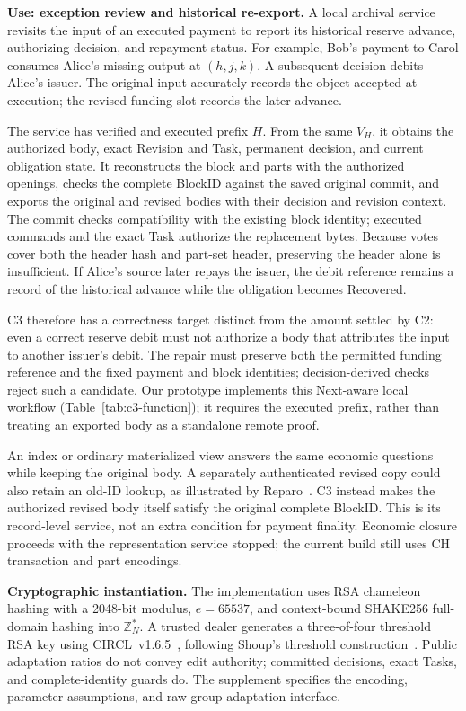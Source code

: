 \noindent\textbf{Use: exception review and historical re-export.}
A local archival service revisits the input of an executed payment
to report its historical reserve advance, authorizing decision, and
repayment status. For example, Bob's payment to Carol consumes Alice's
missing output at $(h,j,k)$. A subsequent decision debits Alice's issuer.
The original input accurately records the object accepted at execution;
the revised funding slot records the later advance.

The service has verified and executed prefix $H$. From the same $V_H$,
it obtains the authorized body, exact Revision and Task, permanent
decision, and current obligation state. It reconstructs the block and
parts with the authorized openings, checks the complete BlockID against
the saved original commit, and exports the original and revised bodies
with their decision and revision context. The commit checks compatibility
with the existing block identity; executed commands and the exact Task
authorize the replacement bytes. Because votes cover both the header
hash and part-set header, preserving the header alone is insufficient.
If Alice's source later repays the issuer, the debit reference remains
a record of the historical advance while the obligation becomes Recovered.

C3 therefore has a correctness target distinct from the amount settled
by C2: even a correct reserve debit must not authorize a body that
attributes the input to another issuer's debit. The repair must preserve
both the permitted funding reference and the fixed payment and block
identities; decision-derived checks reject such a candidate.
Our prototype implements this Next-aware local workflow
(Table~\ref{tab:c3-function}); it requires the executed prefix, rather
than treating an exported body as a standalone remote proof.

An index or ordinary materialized view answers the same economic
questions while keeping the original body. A separately authenticated
revised copy could also retain an old-ID lookup, as illustrated by
Reparo~\cite{reparo}. C3 instead makes the authorized revised body
itself satisfy the original complete BlockID. This is its record-level
service, not an extra condition for payment finality.
Economic closure proceeds with the representation service stopped;
the current build still uses CH transaction and part encodings.

\noindent\textbf{Cryptographic instantiation.}
The implementation uses RSA chameleon hashing with a 2048-bit modulus,
$e=65537$, and context-bound SHAKE256 full-domain hashing into
$\mathbb Z_N^*$. A trusted dealer generates a three-of-four threshold RSA
key using CIRCL~v1.6.5~\cite{circl}, following Shoup's threshold
construction~\cite{shoup}. Public adaptation ratios do not convey edit
authority; committed decisions, exact Tasks, and complete-identity guards
do. The supplement specifies the encoding, parameter assumptions, and
raw-group adaptation interface.
